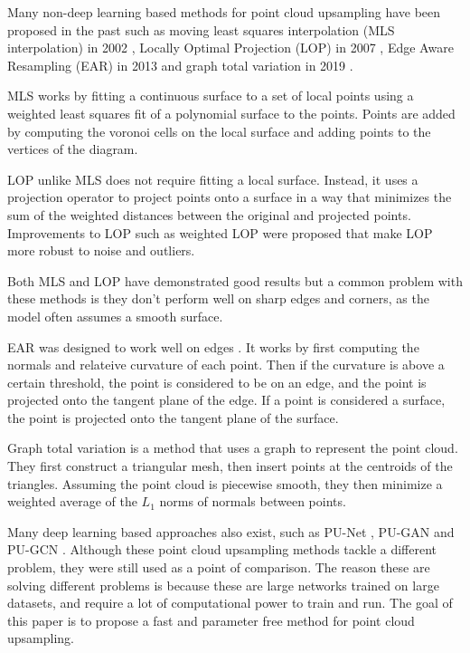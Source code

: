 Many non-deep learning based methods for point cloud upsampling have been proposed in the past such as moving least squares interpolation (MLS interpolation) in 2002 \cite{Alexa2003ComputingAR},
Locally Optimal Projection (LOP) in 2007 \cite{LOP}, Edge Aware Resampling (EAR) in 2013 \cite{EdgeAwareResampling} and graph total variation in 2019 \cite{GraphTotalVariation}.

MLS works by fitting a continuous surface to a set of local points using a weighted least squares fit of a polynomial surface to the points. 
Points are added by computing the voronoi cells on the local surface and adding points to the vertices of the diagram.

LOP unlike MLS does not require fitting a local surface. Instead, it uses a projection operator to project points onto a surface in a way that minimizes the sum of the weighted distances between the original and projected points. Improvements to LOP such as weighted LOP \cite{WLOP} were proposed that make LOP more robust to noise and outliers. 

Both MLS and LOP have demonstrated good results but a common problem with these methods is they don't perform well on sharp edges and corners, as the model often assumes a smooth surface.

EAR was designed to work well on edges \cite{EdgeAwareResampling}. 
It works by first computing the normals and relateive curvature of each point.
Then if the curvature is above a certain threshold, the point is considered to be on an edge, and the point is projected onto the tangent plane of the edge.
If a point is considered a surface, the point is projected onto the tangent plane of the surface.

Graph total variation is a method that uses a graph to represent the point cloud. 
They first construct a triangular mesh, then insert points at the centroids of the triangles. 
Assuming the point cloud is piecewise smooth, they then minimize a weighted average of the $L_1$ norms 
of normals between points.

Many deep learning based approaches also exist, such as PU-Net \cite{PU-Net}, PU-GAN \cite{PU-GAN} and PU-GCN \cite{PU-GCN}. Although these point cloud upsampling methods tackle a different problem, they were still used as a point of comparison.
The reason these are solving different problems is because these are large networks trained on large datasets, and require a lot of computational power to train and run. The goal of this paper is to propose a fast and parameter free method for point cloud upsampling.
